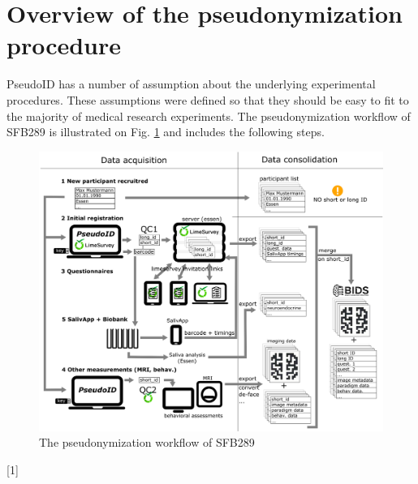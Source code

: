 \section{Overview of the pseudonymization procedure}
PseudoID has a number of assumption about the underlying experimental procedures. These assumptions were defined so that they should be easy to fit to the majority of medical research experiments. The pseudonymization workflow of SFB289 is illustrated on Fig. \ref{fig:flowchart} and includes the following steps.

\begin{figure}[H]
\centering
\includegraphics[width=1.0\textwidth]{docs/fig/overview_v2.eps}
\caption{The pseudonymization workflow of SFB289}
\label{fig:flowchart}
\end{figure}

[1]

